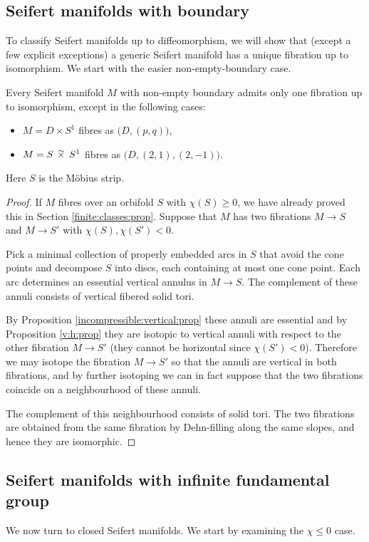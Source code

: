 \subsection{Seifert manifolds with boundary}
To classify Seifert manifolds up to diffeomorphism, we will show that (except a few explicit exceptions) a generic Seifert manifold has a unique fibration up to isomorphism. We start with the easier non-empty-boundary case.

\begin{prop} \label{except:non-empty:prop}
Every Seifert manifold $M$ with non-empty boundary admits only one fibration up to isomorphism, except in the following cases:
\begin{itemize}
\item $M = D \times S^1$ fibres as $\big( D, (p,q) \big)$,
\item $M = S \timtil S^1$ fibres as $\big(D, (2,1), (2,-1) \big)$.
\end{itemize}
Here $S$ is the M\"obius strip.
\end{prop}
\begin{proof}
If $M$ fibres over an orbifold $S$ with $\chi(S)\geqslant 0$, we have already proved this in Section \ref{finite:classes:prop}. Suppose that $M$ has two fibrations $M\to S$ and $M\to S'$ with $\chi(S), \chi(S')< 0$. 

Pick a minimal collection of properly embedded arcs in $S$ that avoid the cone points and decompose $S$ into discs, each containing at most one cone point. Each arc determines an essential vertical annulus in $M\to S$. The complement of these annuli consists of vertical fibered solid tori.

By Proposition \ref{incompressible:vertical:prop} these annuli are essential and by  Proposition \ref{v:h:prop} they are isotopic to vertical annuli with respect to the other fibration $M\to S'$ (they cannot be horizontal since $\chi(S')<0$). Therefore we may isotope the fibration $M\to S'$ so that the annuli are vertical in both fibrations, and by further isotoping we can in fact suppose that the two fibrations coincide on a neighbourhood of these annuli. 

The complement of this neighbourhood consists of solid tori. The two fibrations are obtained from the same fibration by Dehn-filling along the same slopes, and hence they are isomorphic.
\end{proof}

\subsection{Seifert manifolds with infinite fundamental group}
We now turn to closed Seifert manifolds. We start by examining the $\chi\leqslant 0$ case.

